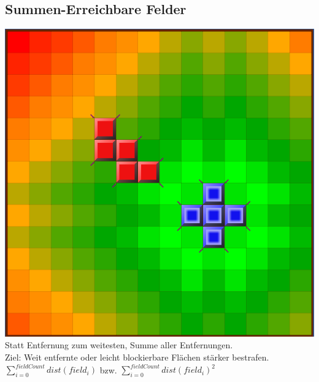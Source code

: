 \documentclass[12pt]{beamer}
\begin{document}
\subsection{Summen-Erreichbare Felder}
\begin{frame}
	\includegraphics[width=0.5\linewidth]{media/wgh10.png}\\
	\pause
	Statt Entfernung zum weitesten, Summe aller Entfernungen.\\
	\pause
	Ziel: Weit entfernte oder leicht blockierbare Flächen stärker bestrafen.\\
	\pause
	$\sum_{i=0}^{fieldCount}{dist(field_i)}$ bzw. $\sum_{i=0}^{fieldCount}{dist(field_i)^2}$
\end{frame}
\end{document}
